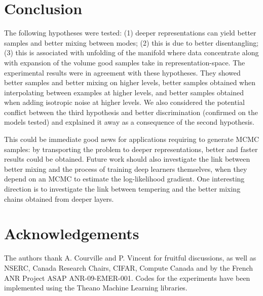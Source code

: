 \vspace*{-2mm}
\section{Conclusion}
\vspace*{-2mm}

The following hypotheses were tested: (1) deeper representations can yield better samples
and better mixing between modes; (2) this is due to better disentangling; (3) this is associated with
unfolding of the manifold where data concentrate along with expansion of the volume
good samples take in representation-space. The experimental results were in agreement
with these hypotheses. They showed better samples and better mixing on higher levels,
better samples obtained when interpolating between examples at higher levels, and
better samples obtained when adding isotropic noise at higher levels. We also considered
the potential conflict between the third hypothesis and better discrimination
(confirmed on the models tested) and explained it away as a consequence of the second
hypothesis.

This could be immediate good news for applications requiring to generate MCMC samples:
by transporting the problem to deeper representations, better and faster results could
be obtained. Future work should also investigate the link between better mixing
and the process of training deep learners themselves, when they depend on an MCMC to estimate the log-likelihood
gradient.  One interesting direction is to investigate the link between tempering and
the better mixing chains obtained from deeper layers.\\

\section{Acknowledgements}

The authors thank A. Courville and P. Vincent for fruitful discussions, as
well as NSERC, Canada Research Chairs, CIFAR, Compute Canada and by the French 
ANR Project ASAP ANR-09-EMER-001. Codes for the experiments have been implemented using the
Theano \citep{bergstra+al:2010-scipy} Machine Learning libraries.

%
%
%
%


%
